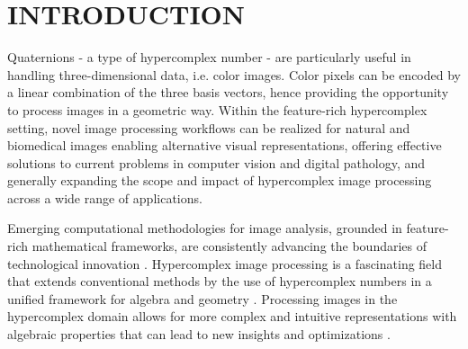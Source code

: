 \documentclass[superscriptaddress,longbibliography,aps,prl,twocolumn,10pt]{revtex4-2}
\begin{document}
\maketitle


\section*{\large\uppercase{Introduction}}

\begin{tcolorbox}[colframe=black!25,colback=orange!15,boxrule=1pt,coltitle=black]
\small{Quaternions - a type of hypercomplex number - are particularly useful in handling three-dimensional data, i.e. color images. Color pixels can be encoded by a linear combination of the three basis vectors, hence providing the opportunity to process images in a geometric way. Within the feature-rich hypercomplex setting, novel image processing workflows can be realized for natural and biomedical images enabling alternative visual representations, offering effective solutions to current problems in computer vision and digital pathology, and generally expanding the scope and impact of hypercomplex image processing across a wide range of applications.}
\end{tcolorbox}

Emerging computational methodologies for image analysis, grounded in feature-rich mathematical frameworks, are consistently advancing the boundaries of technological innovation \cite{Valous2024_1}. Hypercomplex image processing is a fascinating field that extends conventional methods by the use of hypercomplex numbers in a unified framework for algebra and geometry \cite{Valous2024_1}. Processing images in the hypercomplex domain allows for more complex and intuitive representations with algebraic properties that can lead to new insights and optimizations \cite{Valous2024_1, Valous2024_2}.
\end{document}
